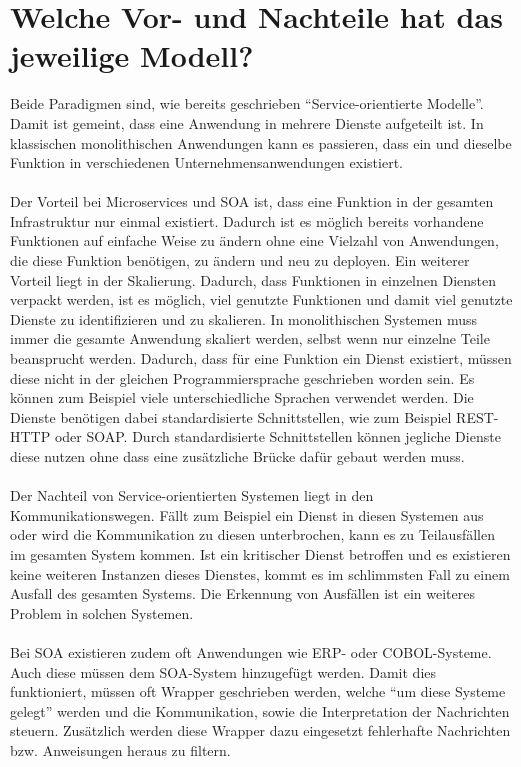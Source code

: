 \section{Welche Vor- und Nachteile hat das jeweilige Modell?}
\label{sec:VorNachteile}
Beide Paradigmen sind, wie bereits geschrieben "`Service-orientierte Modelle"'. Damit ist gemeint, dass eine Anwendung in mehrere Dienste aufgeteilt ist. In klassischen monolithischen Anwendungen kann es passieren, dass ein und dieselbe Funktion in verschiedenen Unternehmensanwendungen existiert.
\\\\
Der Vorteil bei Microservices und SOA ist, dass eine Funktion in der gesamten Infrastruktur nur einmal existiert. Dadurch ist es möglich bereits vorhandene Funktionen auf einfache Weise zu ändern ohne eine Vielzahl von Anwendungen, die diese Funktion benötigen, zu ändern und neu zu deployen.
Ein weiterer Vorteil liegt in der Skalierung. Dadurch, dass Funktionen in einzelnen Diensten verpackt werden, ist es möglich, viel genutzte Funktionen und damit viel genutzte Dienste zu identifizieren und zu skalieren. In monolithischen Systemen muss immer die gesamte Anwendung skaliert werden, selbst wenn nur einzelne Teile beansprucht werden.
Dadurch, dass für eine Funktion ein Dienst existiert, müssen diese nicht in der gleichen Programmiersprache geschrieben worden sein. Es können zum Beispiel viele unterschiedliche Sprachen verwendet werden. Die Dienste benötigen dabei standardisierte Schnittstellen, wie zum Beispiel REST-HTTP oder SOAP. Durch standardisierte Schnittstellen können jegliche Dienste diese nutzen ohne dass eine zusätzliche Brücke dafür gebaut werden muss.
\\\\
Der Nachteil von Service-orientierten Systemen liegt in den Kommunikationswegen. Fällt zum Beispiel ein Dienst in diesen Systemen aus oder wird die Kommunikation zu diesen unterbrochen, kann es zu Teilausfällen im gesamten System kommen. Ist ein kritischer Dienst betroffen und es existieren keine weiteren Instanzen dieses Dienstes, kommt es im schlimmsten Fall zu einem Ausfall des gesamten Systems. Die Erkennung von Ausfällen ist ein weiteres Problem in solchen Systemen.
\\\\
Bei SOA existieren zudem oft Anwendungen wie ERP- oder COBOL-Systeme. Auch diese müssen dem SOA-System hinzugefügt werden. Damit dies funktioniert, müssen oft Wrapper geschrieben werden, welche "`um diese Systeme gelegt"' werden und die Kommunikation, sowie die Interpretation der Nachrichten steuern. Zusätzlich werden diese Wrapper dazu eingesetzt fehlerhafte Nachrichten bzw. Anweisungen heraus zu filtern.

